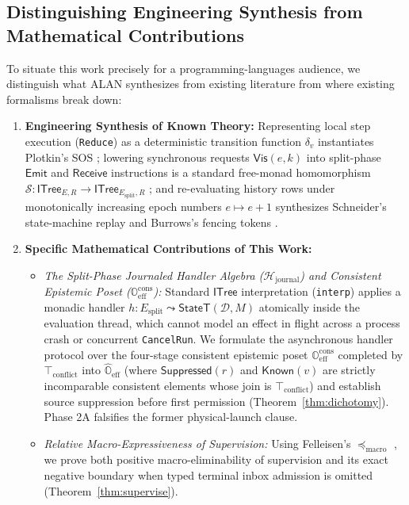\documentclass[11pt,a4paper]{article}
\theoremstyle{definition}
\theoremstyle{remark}
\newcommand{\ITree}{\mathsf{ITree}}
\begin{document}
\subsection{Distinguishing Engineering Synthesis from Mathematical Contributions}
To situate this work precisely for a programming-languages audience, we distinguish what ALAN synthesizes from existing literature from where existing formalisms break down:
\begin{enumerate}
  \item \textbf{Engineering Synthesis of Known Theory:} Representing local step execution (\texttt{Reduce}) as a deterministic transition function $\delta_v$ instantiates Plotkin's SOS \cite{plotkin1981structural}; lowering synchronous requests $\mathsf{Vis}(e, k)$ into split-phase $\mathsf{Emit}$ and $\mathsf{Receive}$ instructions is a standard free-monad homomorphism $\mathcal{S} : \ITree_{E,R} \to \ITree_{E_{\text{split}}, R}$ \cite{xia2020interaction}; and re-evaluating history rows under monotonically increasing epoch numbers $e \mapsto e+1$ synthesizes Schneider's state-machine replay \cite{schneider1990implementing} and Burrows's fencing tokens \cite{burrows2006chubby}.
  \item \textbf{Specific Mathematical Contributions of This Work:}
  \begin{itemize}
    \item \emph{The Split-Phase Journaled Handler Algebra ($\mathcal{H}_{\text{journal}}$) and Consistent Epistemic Poset ($\mathbb{O}_{\text{eff}}^{\text{cons}}$):} Standard $\ITree$ interpretation (\texttt{interp}) applies a monadic handler $h : E_{\text{split}} \leadsto \mathsf{StateT}(\mathcal{D}, M)$ atomically inside the evaluation thread, which cannot model an effect in flight across a process crash or concurrent \texttt{CancelRun}. We formulate the asynchronous handler protocol over the four-stage consistent epistemic poset $\mathbb{O}_{\text{eff}}^{\text{cons}}$ completed by $\top_{\text{conflict}}$ into $\widehat{\mathbb{O}}_{\text{eff}}$ (where $\mathsf{Suppressed}(r)$ and $\mathsf{Known}(v)$ are strictly incomparable consistent elements whose join is $\top_{\text{conflict}}$) and establish source suppression before first permission (Theorem~\ref{thm:dichotomy}). Phase 2A falsifies the former physical-launch clause.
    \item \emph{Relative Macro-Expressiveness of Supervision:} Using Felleisen's $\preceq_{\text{macro}}$ \cite{felleisen1991expressive}, we prove both positive macro-eliminability of supervision and its exact negative boundary when typed terminal inbox admission is omitted (Theorem~\ref{thm:supervise}).

\end{itemize}
\end{enumerate}
\end{document}

